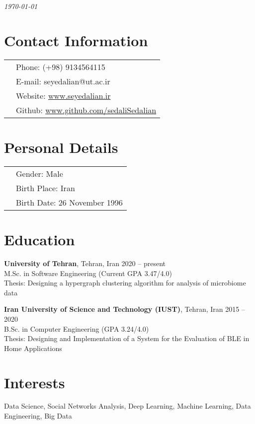 \documentclass[margin,line]{res}
\begin{document}
 \hfill {\em \today}

\begin{resume}
\section{\sc Contact Information}

\vspace{.05in}
\begin{tabular}{@{}p{3.5in}p{3in}}
& {Phone:}  (+98) 9134564115 \\
& {E-mail:}  seyedalian@ut.ac.ir\\
& {Website:} \url{www.seyedalian.ir}\\
& {Github:}  \url{www.github.com/sedaliSedalian}

\end{tabular}
\section{\sc Personal Details}
\begin{tabular}{@{}p{3.5in}p{3in}}
	& {Gender:}  Male \\
	& {Birth Place:}  Iran \\
	& {Birth Date:}  26 November 1996 \\
\end{tabular}

\section{\sc Education}
{\bf University of Tehran}, Tehran, Iran \hfill 2020 -- present\\
M.Sc. in Software Engineering \hfill(Current GPA 3.47/4.0)\\
Thesis: Designing a hypergraph clustering algorithm for analysis of microbiome data


{\bf Iran University of  Science and Technology (IUST)}, Tehran, Iran \hfill 2015 -- 2020\\
B.Sc. in Computer Engineering \hfill(GPA 3.24/4.0)\\
Thesis: Designing and Implementation of a System for the Evaluation of BLE in Home Applications


\section{\sc Interests}
Data Science, Social Networks Analysis, Deep Learning, Machine Learning, Data Engineering, Big Data

\end{resume}
\end{document}
